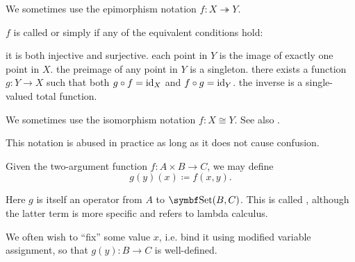 \begin{definition}
\begin{defenum}
    We sometimes use the epimorphism notation \( f: X \twoheadrightarrow Y \).

     \( f \) is called  or simply  if any of the equivalent conditions hold:
    \begin{defenum}
       it is both injective and surjective.
       each point in \( Y \) is the image of exactly one point in \( X \).
       the preimage of any point in \( Y \) is a singleton.
       there exists a function \( g: Y \to X \) such that both \( g \circ f = \operatorname{id}_X \) and \( f \circ g = \operatorname{id}_Y \).
       the inverse is a single-valued total function.
    \end{defenum}

    We sometimes use the isomorphism notation \( f: X \cong Y \). See also .
  \end{defenum}
\end{definition}

\begin{definition}\label{def:currying}
  This notation is abused in practice as long as it does not cause confusion.

  Given the two-argument function \( f: A \times B \to C \), we may define
  \begin{equation*}
    g(y)(x) \coloneqq f(x, y).
  \end{equation*}

  Here \( g \) is itself an operator from \( A \) to \( \Cat{Set}(B, C) \). This is called , although the latter term is more specific and refers to lambda calculus.

  We often wish to \enquote{fix} some value \( x \), i.e. bind it using modified variable assignment, so that \( g(y): B \to C \) is well-defined.
\end{definition}

